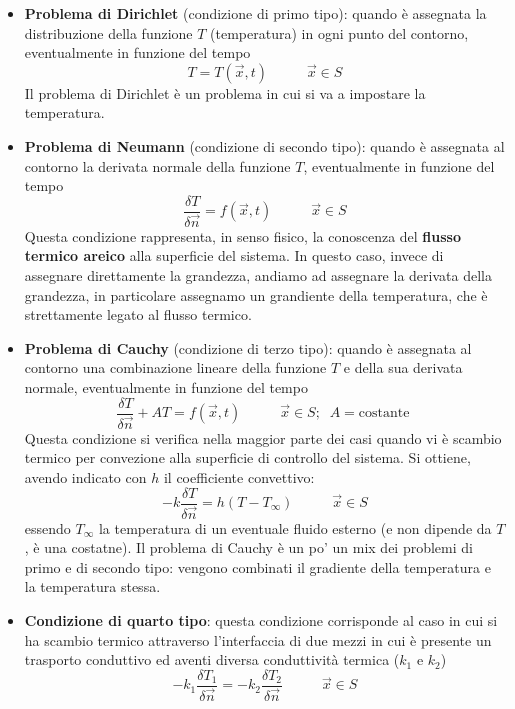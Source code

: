 \begin{itemize}
    \item \textbf{Problema di Dirichlet} (condizione di primo tipo): quando è assegnata la distribuzione della funzione $T$ (temperatura) in ogni punto del contorno, eventualmente in funzione del tempo
    \[
        T = T(\vec{x},t) \;\;\;\;\;\;\;\;\;\;\vec{x} \in S
    \]
    Il problema di Dirichlet è un problema in cui si va a impostare la temperatura.
    \item \textbf{Problema di Neumann} (condizione di secondo tipo): quando è assegnata al contorno la derivata normale della funzione $T$, eventualmente in funzione del tempo
    \[
        \frac{\delta T}{\delta \vec{n}} = f(\vec{x},t) \;\;\;\;\;\;\;\;\;\; \vec{x} \in S
    \]
    Questa condizione rappresenta, in senso fisico, la conoscenza del \textbf{flusso termico areico} alla superficie del sistema.\newline
    \newline
    In questo caso, invece di assegnare direttamente la grandezza, andiamo ad assegnare la derivata della grandezza, in particolare assegnamo un grandiente della temperatura, che è strettamente legato al flusso termico.
    \item \textbf{Problema di Cauchy} (condizione di terzo tipo): quando è assegnata al contorno una combinazione lineare della funzione $T$ e della sua derivata normale, eventualmente in funzione del tempo
    \[
        \frac{\delta T}{\delta \vec{n}} + A T = f(\vec{x}, t) \;\;\;\;\;\;\;\;\;\; \vec{x} \in S; \;\; A = \text{costante}\;
    \]
    Questa condizione si verifica nella maggior parte dei casi quando vi è scambio termico per convezione alla superficie di controllo del sistema. Si ottiene, avendo indicato con $h$ il coefficiente convettivo:
    \[
        -k \frac{\delta T}{\delta \vec{n}} = h (T-T_{\infty}) \;\;\;\;\;\;\;\;\;\; \vec{x} \in S
    \]
    essendo $T_{\infty}$ la temperatura di un eventuale fluido esterno (e non dipende da $T$, è una costatne).\newline
    \newline
    Il problema di Cauchy è un po' un mix dei problemi di primo e di secondo tipo: vengono combinati il gradiente della temperatura e la temperatura stessa.
    \item \textbf{Condizione di quarto tipo}: questa condizione corrisponde al caso in cui si ha scambio termico attraverso l'interfaccia di due mezzi in cui è presente un trasporto conduttivo ed aventi diversa conduttività termica ($k_1$ e $k_2$)
    \[
        -k_1 \frac{\delta T_1}{\delta \vec{n}} = -k_2 \frac{\delta T_2}{\delta \vec{n}} \;\;\;\;\;\;\;\;\;\; \vec{x} \in S
\]
\end{itemize}
